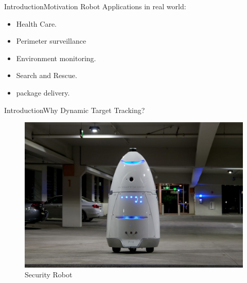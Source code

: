\documentclass{beamer}
\begin{document}
\begin{frame}{Introduction}{Motivation}
Robot Applications in real world:
\begin{itemize}
\item Health Care.
\item  Perimeter surveillance 
\item Environment monitoring. 
\item  Search and Rescue.
\item package delivery.
\end{itemize}
  
\end{frame}

\begin{frame}{Introduction}{Why Dynamic Target Tracking?}
\begin{figure}
\includegraphics[scale=0.2]{figs/img/security.jpg}
\caption{Security Robot}
\end{figure}
\end{frame}

\end{document}
